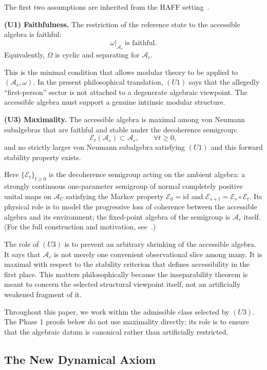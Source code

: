 \documentclass[12pt]{article}
\theoremstyle{definition}
\theoremstyle{remark}
\begin{document}
The first two assumptions are inherited from the HAFF
setting~\cite{Liu2026PaperD}.

\textbf{(U1) Faithfulness.}
The restriction of the reference state to the accessible algebra is
faithful: \[
\omega|_{\mathcal{A}_c}\ \text{is faithful}.
\] Equivalently, \(\Omega\) is cyclic and separating for
\(\mathcal{A}_c\).

This is the minimal condition that allows modular theory to be applied
to \((\mathcal{A}_c,\omega)\). In the present philosophical translation,
\((U1)\) says that the allegedly ``first-person'' sector is not attached
to a degenerate algebraic viewpoint. The accessible algebra must support
a genuine intrinsic modular structure.

\textbf{(U3) Maximality.}
The accessible algebra is maximal among von Neumann subalgebras that are
faithful and stable under the decoherence semigroup: \[
\mathcal{E}_t(\mathcal{A}_c)\subset \mathcal{A}_c,
\qquad
\forall t\ge 0,
\] and no strictly larger von Neumann subalgebra satisfying \((U1)\) and
this forward stability property exists.

Here \(\{\mathcal{E}_t\}_{t\ge 0}\) is the decoherence semigroup acting
on the ambient algebra: a strongly continuous one-parameter semigroup of
normal completely positive unital maps on \(\mathcal{A}_U\) satisfying
the Markov property \(\mathcal{E}_0=\mathrm{id}\) and
\(\mathcal{E}_{s+t}=\mathcal{E}_s\circ\mathcal{E}_t\). Its physical
role is to model the progressive loss of coherence between the
accessible algebra and its environment; the fixed-point algebra of the
semigroup is \(\mathcal{A}_c\) itself. (For the full construction and
motivation, see~\cite{Liu2026PaperD}.)

The role of \((U3)\) is to prevent an arbitrary shrinking of the
accessible algebra. It says that \(\mathcal{A}_c\) is not merely one
convenient observational slice among many. It is maximal with respect to
the stability criterion that defines accessibility in the first place.
This matters philosophically because the inseparability theorem is meant
to concern the selected structural viewpoint itself, not an artificially
weakened fragment of it.

Throughout this paper, we work within the admissible class selected by
\((U3)\). The Phase 1 proofs below do not use maximality directly; its
role is to ensure that the algebraic datum is canonical rather than
artificially restricted.

\subsection{The New Dynamical Axiom}\label{the-new-dynamical-axiom}
\end{document}
